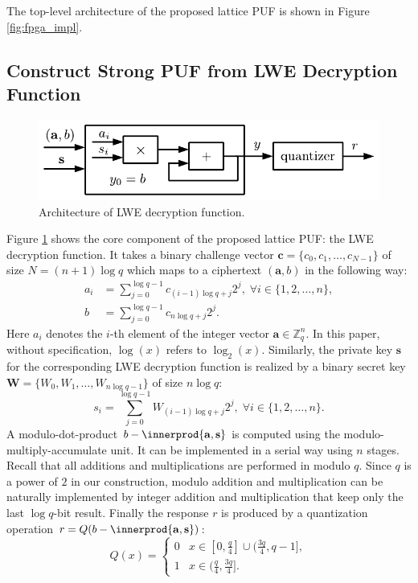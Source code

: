 The top-level architecture of the proposed lattice PUF is shown in Figure \ref{fig:fpga_impl}.



\subsection{Construct Strong PUF from LWE Decryption Function}
\label{sec:lwe_dec}
\begin{figure}[t!]
    \centering
    \includegraphics[width = 0.8\linewidth]{./figs/lwe_dec.pdf}
    \caption{Architecture of LWE decryption function.}
    \label{fig:lwedec}
\end{figure}

Figure \ref{fig:lwedec} shows the core component of the proposed lattice PUF: the LWE decryption function. 
It takes a binary challenge vector $\mathbf{c} = \{c_0,c_1,\ldots,c_{N-1}\}$ of size $N = (n+1)\log q$ which maps to a ciphertext $(\mathbf{a},b)$ in the following way:
\begin{align*}
a_i &= \sum_{j=0}^{\log q-1}c_{(i-1)\log q+j}2^j,\; \forall i\in \{1,2,\ldots,n\}, \\
b &= \sum_{j=0}^{\log q-1}c_{n\log q+j}2^j. 
\end{align*}
Here $a_i$ denotes the $i$-th element of the integer vector $\mathbf{a}\in\mathbb{Z}_q^n$.
In this paper, without specification, $\log(x)$ refers to $\log_2(x)$.
Similarly, the private key $\mathbf{s}$ for the corresponding LWE decryption function is realized by a binary secret key $\mathbf{W} =\{W_0,W_1,\ldots,W_{n\log q-1}\} $ of size $n\log q$:
\begin{equation*}
s_i=\sum_{j=0}^{\log q-1} W_{(i-1)\log q+j} 2^j,\; \forall i\in \{1,2,\ldots,n\}.
\end{equation*}
A modulo-dot-product $b-\innerprod{\mathbf{a},\mathbf{s}}$ is computed using the modulo-multiply-accumulate unit. 
It can be implemented in a serial way using $n$ stages. 
Recall that all additions and multiplications are performed in modulo $q$.
Since $q$ is a power of $2$ in our construction, modulo addition and multiplication can be naturally implemented by integer addition and multiplication that keep only the last $\log q$-bit result. 
Finally the response $r$ is produced by a quantization operation $r = Q(b-\innerprod{\mathbf{a},\mathbf{s}})$: 
\begin{equation*}
Q(x) = \begin{cases}
	0& x \in [0,\frac{q}{4}]\cup(\frac{3q}{4},q-1],\\
	1& x \in (\frac{q}{4},\frac{3q}{4}].
\end{cases}
\end{equation*}

